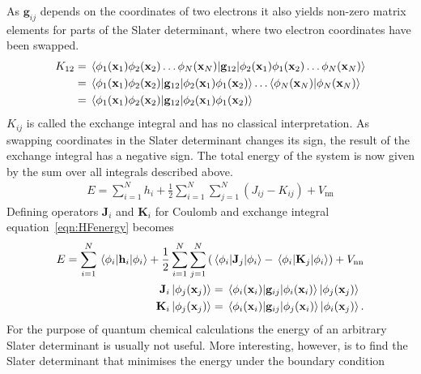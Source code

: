 %
As $\mathbf{g}_{ij}$ depends on the coordinates of two electrons it also yields
non-zero matrix elements for parts of the Slater determinant, where two
electron coordinates have been swapped.
%
\begin{align}
    \begin{aligned}
        K_{12}&=\mel{\phi_1(\mathbf{x}_1)\phi_2(\mathbf{x}_2)\ldots\phi_N(\mathbf{x}_N)}{\mathbf{g}_{12}}{\phi_2(\mathbf{x}_1)\phi_1(\mathbf{x}_2)\ldots\phi_N(\mathbf{x}_N)}\\
        &=\mel{\phi_1(\mathbf{x}_1)\phi_2(\mathbf{x}_2)}{\mathbf{g}_{12}}{\phi_2(\mathbf{x}_1)\phi_1(\mathbf{x}_2)}\ldots\braket{\phi_N(\mathbf{x}_N)} \\
        &=\mel{\phi_1(\mathbf{x}_1)\phi_2(\mathbf{x}_2)}{\mathbf{g}_{12}}{\phi_2(\mathbf{x}_1)\phi_1(\mathbf{x}_2)}
    \end{aligned}
\end{align}
%
$K_{ij}$ is called the exchange integral and has no classical interpretation.
As swapping coordinates in the Slater determinant changes its sign, the result
of the exchange integral has a negative sign. The total energy of the system is
now given by the sum over all integrals described above.
%
\begin{align}
    E=\sum_{i=1}^Nh_i + \frac{1}{2}\sum_{i=1}^N\sum_{j=1}^N(J_{ij}-K_{ij})+V_\text{nn}\label{eqn:HFenergy}
\end{align}
%
Defining operators $\mathbf{J}_i$ and $\mathbf{K}_i$ for Coulomb and exchange
integral equation~\eqref{eqn:HFenergy} becomes
%
\begin{align}
    E=\sum_{i=1}^N\mel{\phi_i}{\mathbf{h}_i}{\phi_i} + \frac{1}{2}\sum_{i=1}^N\sum_{j=1}^N \left( \mel{\phi_i}{\mathbf{J}_j}{\phi_i} - \mel{\phi_i}{\mathbf{K}_j}{\phi_i} \right) + V_\text{nn}\\
    \begin{aligned}
        \mathbf{J}_i\ket{\phi_j(\mathbf{x}_j)}&=\mel{\phi_i(\mathbf{x}_i)}{\mathbf{g}_{ij}}{\phi_i(\mathbf{x}_i)}\ket{\phi_j(\mathbf{x}_j)}\\
        \mathbf{K}_i\ket{\phi_j(\mathbf{x}_j)}&=\mel{\phi_i(\mathbf{x}_i)}{\mathbf{g}_{ij}}{\phi_j(\mathbf{x}_i)}\ket{\phi_i(\mathbf{x}_j)}.
    \end{aligned}\label{eqn:HFenergyoperator}
\end{align}
%
For the purpose of quantum chemical calculations the energy of an arbitrary
Slater determinant is usually not useful. More interesting, however, is to find
the Slater determinant that minimises the energy under the boundary condition
